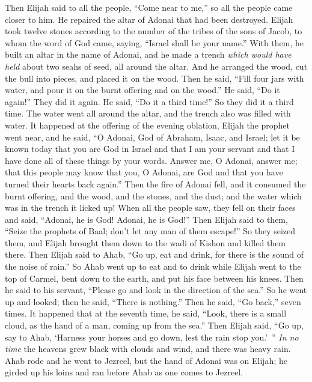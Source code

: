 \begin{biblechapter}
\verse Then Elijah said to all the people, “Come near to me,” so all the people came closer to him. He repaired the altar of Adonai that had been destroyed.
\verse Elijah took twelve stones according to the number of the tribes of the sons of Jacob, to whom the word of God came, saying, “Israel shall be your name.”
\verse With them, he built an altar in the name of Adonai, and he made a trench \textit{which would have held} about two seahs of seed, all around the altar.
\verse And he arranged the wood, cut the bull into pieces, and placed it on the wood. Then he said, “Fill four jars with water, and pour it on the burnt offering and on the wood.”
\verse He said, “Do it again!” They did it again. He said, “Do it a third time!” So they did it a third time.
\verse The water went all around the altar, and the trench also was filled with water.
\verse It happened at the offering of the evening oblation, Elijah the prophet went near, and he said, “O Adonai, God of Abraham, Isaac, and Israel; let it be known today that you are God in Israel and that I am your servant and that I have done all of these things by your words.
\verse Answer me, O Adonai, answer me; that this people may know that you, O Adonai, are God and that you have turned their hearts back again.”
\verse Then the fire of Adonai fell, and it consumed the burnt offering, and the wood, and the stones, and the dust; and the water which was in the trench it licked up!
\verse When all the people saw, they fell on their faces and said, “Adonai, he is God! Adonai, he is God!”
\verse Then Elijah said to them, “Seize the prophets of Baal; don’t let any man of them escape!” So they seized them, and Elijah brought them down to the wadi of Kishon and killed them there.
\verse Then Elijah said to Ahab, “Go up, eat and drink, for there is the sound of the noise of rain.”
\verse So Ahab went up to eat and to drink while Elijah went to the top of Carmel, bent down to the earth, and put his face between his knees.
\verse Then he said to his servant, “Please go and look in the direction of the sea.” So he went up and looked; then he said, “There is nothing.” Then he said, “Go back,” seven times.
\verse It happened that at the seventh time, he said, “Look, there is a small cloud, as the hand of a man, coming up from the sea.” Then Elijah said, “Go up, say to Ahab, ‘Harness your horses and go down, lest the rain stop you.’ ”
\verse \textit{In no time} the heavens grew black with clouds and wind, and there was heavy rain. Ahab rode and he went to Jezreel,
\verse but the hand of Adonai was on Elijah; he girded up his loins and ran before Ahab as one comes to Jezreel.
\end{biblechapter}

